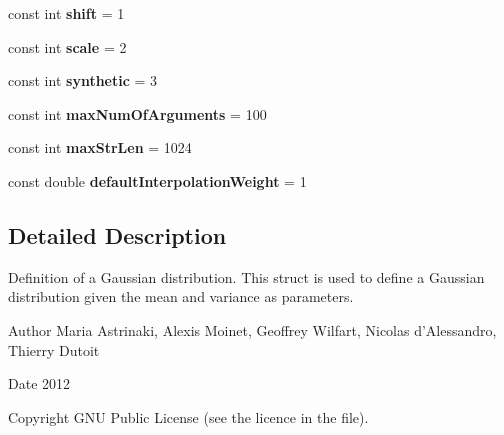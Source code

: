 \begin{DoxyCompactItemize}
\item 
\hypertarget{namespace_m_a_g_e_a8a38b5e1998068ddd8c6037925561945}{const int {\bfseries shift} = 1}\label{namespace_m_a_g_e_a8a38b5e1998068ddd8c6037925561945}

\item 
\hypertarget{namespace_m_a_g_e_a6f86b724735cda5a8243392b24cdb3ef}{const int {\bfseries scale} = 2}\label{namespace_m_a_g_e_a6f86b724735cda5a8243392b24cdb3ef}

\item 
\hypertarget{namespace_m_a_g_e_a6cac226dc53fdcfe78b5478568d15ba8}{const int {\bfseries synthetic} = 3}\label{namespace_m_a_g_e_a6cac226dc53fdcfe78b5478568d15ba8}

\item 
\hypertarget{namespace_m_a_g_e_acf59391d7f0ea3cbe5cea815bdc8a92f}{const int {\bfseries max\-Num\-Of\-Arguments} = 100}\label{namespace_m_a_g_e_acf59391d7f0ea3cbe5cea815bdc8a92f}

\item 
\hypertarget{namespace_m_a_g_e_aecaa791f74be49fa20a279fc68eeadff}{const int {\bfseries max\-Str\-Len} = 1024}\label{namespace_m_a_g_e_aecaa791f74be49fa20a279fc68eeadff}

\item 
\hypertarget{namespace_m_a_g_e_a0b2bdf6bd33e8418547f3d520e3778bc}{const double {\bfseries default\-Interpolation\-Weight} = 1}\label{namespace_m_a_g_e_a0b2bdf6bd33e8418547f3d520e3778bc}

\end{DoxyCompactItemize}


\subsection{Detailed Description}
Definition of a Gaussian distribution. This struct is used to define a Gaussian distribution given the mean and variance as parameters.

\begin{DoxyAuthor}{Author}
Maria Astrinaki, Alexis Moinet, Geoffrey Wilfart, Nicolas d'Alessandro, Thierry Dutoit
\end{DoxyAuthor}
\begin{DoxyDate}{Date}
2012 
\end{DoxyDate}
\begin{DoxyCopyright}{Copyright}
G\-N\-U Public License (see the licence in the file). 
\end{DoxyCopyright}
